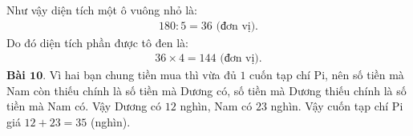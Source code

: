 \begin{multicols}{2}
\begin{figure}[H]
		\vspace*{-15pt}
	\end{figure}
	Như vậy diện tích một ô vuông nhỏ là: 
	\begin{align*}
		180:5 = 36 \text{ (đơn vị).}
	\end{align*}
	Do đó diện tích phần được tô đen là: 
	\begin{align*}
		36\times 4 = 144 \text{ (đơn vị).}
	\end{align*}
	\textbf{\color{toancuabi}Bài $\pmb{10.}$} Vì hai bạn chung tiền mua thì vừa đủ $1$ cuốn tạp chí Pi, nên số tiền mà Nam còn thiếu chính là số tiền mà Dương có, số tiền mà Dương thiếu chính là số tiền mà Nam có. Vậy Dương có $12$ nghìn, Nam có $23$ nghìn. Vậy cuốn tạp chí Pi giá $12+23=35$ (nghìn).
\end{multicols}
\newpage
\graphicspath{{../toancuabi/pic/}}
\begingroup
{}  
